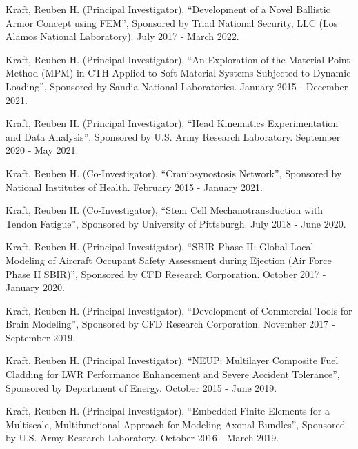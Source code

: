 \documentclass[a4paper,10pt]{article}
\begin{document}
\noindent Kraft, Reuben H. (Principal Investigator), ``Development of a Novel Ballistic Armor Concept using FEM'', Sponsored by Triad National Security, LLC (Los Alamos National Laboratory). July 2017 - March 2022.\vspace{0.25cm}

\noindent Kraft, Reuben H. (Principal Investigator), ``An Exploration of the Material Point Method (MPM) in CTH Applied to Soft Material Systems Subjected to Dynamic Loading'', Sponsored by Sandia National Laboratories. January 2015 - December 2021.\vspace{0.25cm}

\noindent Kraft, Reuben H. (Principal Investigator), ``Head Kinematics Experimentation and Data Analysis'', Sponsored by U.S. Army Research Laboratory. September 2020 - May 2021.\vspace{0.25cm}

\noindent Kraft, Reuben H. (Co-Investigator), ``Craniosynostosis Network'', Sponsored by National Institutes of Health. February 2015 - January 2021.\vspace{0.25cm}

\noindent Kraft, Reuben H. (Co-Investigator), ``Stem Cell Mechanotransduction with Tendon Fatigue'', Sponsored by University of Pittsburgh. July 2018 - June 2020.\vspace{0.25cm}

\noindent Kraft, Reuben H. (Principal Investigator), ``SBIR Phase II: Global-Local Modeling of Aircraft Occupant Safety Assessment during Ejection (Air Force Phase II SBIR)'', Sponsored by CFD Research Corporation. October 2017 - January 2020.\vspace{0.25cm}

\noindent Kraft, Reuben H. (Principal Investigator), ``Development of Commercial Tools for Brain Modeling'', Sponsored by CFD Research Corporation. November 2017 - September 2019.\vspace{0.25cm}

\noindent Kraft, Reuben H. (Principal Investigator), ``NEUP: Multilayer Composite Fuel Cladding for LWR Performance Enhancement and Severe Accident Tolerance'', Sponsored by Department of Energy. October 2015 - June 2019.\vspace{0.25cm}

\noindent Kraft, Reuben H. (Principal Investigator), ``Embedded Finite Elements for a Multiscale, Multifunctional Approach for Modeling Axonal Bundles'', Sponsored by U.S. Army Research Laboratory. October 2016 - March 2019.\vspace{0.25cm}
\end{document}

